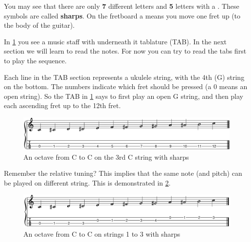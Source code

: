 You may see that there are only \textbf{7} different letters and \textbf{5} letters with a \textbf{\sharp}. These \sharp symbols are called \textbf{sharps}. On the fretboard a \sharp means you move one fret up (to the body of the guitar).


In \ref{fig:ukulele_single_string_octave_sharps} you see a music staff with underneath it tablature (TAB). In the next section we will learn to read the notes. For now you can try to read the tabs first to play the sequence.

Each line in the TAB section represents a ukulele string, with the 4th (G) string on the bottom. The numbers indicate which fret should be pressed (a 0 means an open string). So the TAB in \ref{fig:ukulele_single_string_octave_sharps} says to first play an open G string, and then play each ascending fret up to the 12th fret.

\begin{figure}[h]
    \centering
    \includegraphics[width=\textwidth]{../MuseScore/Ukulele/UkuleleChromaticNotesSharpsSingleString.png}
    \caption{An octave from C to C on the 3rd C string with sharps}
    \label{fig:ukulele_single_string_octave_sharps}
\end{figure}

 Remember the relative tuning? This implies that the same note (and pitch) can be played on different string. This is demonstrated in \ref{fig:ukulele_multi_string_octave_sharps}.

\begin{figure}[h]
    \centering
    \includegraphics[width=\textwidth]{../MuseScore/Ukulele/UkuleleChromaticNotesSharpsMultiString.png}
    \caption{An octave from C to C on strings 1 to 3 with sharps}
    \label{fig:ukulele_multi_string_octave_sharps}
\end{figure}


